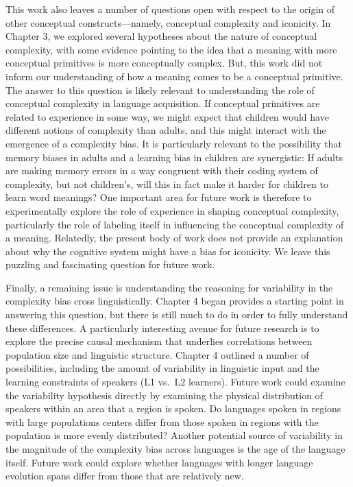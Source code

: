 This work also leaves a number of questions open with respect to the origin of other conceptual constructs---namely, conceptual complexity and iconicity. In Chapter 3, we explored several hypotheses about the nature of conceptual complexity, with some evidence pointing to the idea that a meaning with more conceptual primitives is more conceptually complex. But, this work did not inform our understanding of how a meaning comes to be a conceptual primitive. The answer to this question is likely relevant to understanding the role of conceptual complexity in language acquisition. If conceptual primitives are related to experience in some way, we might expect that children would have different notions of complexity than adults, and this might interact with the emergence of a complexity bias. It is particularly relevant to the possibility that memory biases in adults and a learning bias in children are synergistic: If adults are making memory errors in a way congruent with their coding system of complexity, but not children's, will this in fact make it harder for children to learn word meanings? One important area for future work is therefore  to experimentally explore the role of experience in shaping conceptual complexity, particularly the role of labeling itself in influencing the conceptual complexity of a meaning.  Relatedly, the present body of  work does not provide an explanation about why the cognitive system might have a bias for iconicity. We leave this puzzling and fascinating question for future work.


Finally, a remaining issue is understanding the reasoning for variability in the complexity bias cross linguistically. Chapter 4 began provides a starting point in answering this question, but there is still much to do in order to fully understand these differences. A particularly interesting avenue for future research is to explore the precise causal mechanism that underlies correlations between population size and linguistic structure. Chapter 4 outlined a number of possibilities, including the amount of variability in linguistic input and the learning constraints of speakers (L1 vs.\ L2 learners). Future work could examine the variability hypothesis directly by examining the physical distribution of speakers within an area that a region is spoken. Do languages spoken in regions with  large populations centers differ from those spoken in regions with the population is more evenly distributed? Another potential source of variability in the magnitude of the complexity bias across languages is the age of the language itself. Future work could explore whether languages with longer language evolution spans differ from those that are relatively new. 

